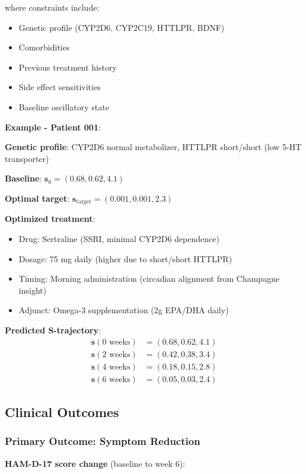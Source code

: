 where constraints include:
\begin{itemize}
\item Genetic profile (CYP2D6, CYP2C19, HTTLPR, BDNF)
\item Comorbidities
\item Previous treatment history
\item Side effect sensitivities
\item Baseline oscillatory state
\end{itemize}

\textbf{Example - Patient 001}:

\textbf{Genetic profile}: CYP2D6 normal metabolizer, HTTLPR short/short (low 5-HT transporter)

\textbf{Baseline}: $\mathbf{s}_0 = (0.68, 0.62, 4.1)$

\textbf{Optimal target}: $\mathbf{s}_{\text{target}} = (0.001, 0.001, 2.3)$

\textbf{Optimized treatment}:
\begin{itemize}
\item Drug: Sertraline (SSRI, minimal CYP2D6 dependence)
\item Dosage: 75 mg daily (higher due to short/short HTTLPR)
\item Timing: Morning administration (circadian alignment from Champagne insight)
\item Adjunct: Omega-3 supplementation (2g EPA/DHA daily)
\end{itemize}

\textbf{Predicted S-trajectory}:
\begin{align}
\mathbf{s}(0\text{ weeks}) &= (0.68, 0.62, 4.1) \\
\mathbf{s}(2\text{ weeks}) &= (0.42, 0.38, 3.4) \\
\mathbf{s}(4\text{ weeks}) &= (0.18, 0.15, 2.8) \\
\mathbf{s}(6\text{ weeks}) &= (0.05, 0.03, 2.4)
\end{align}

\subsection{Clinical Outcomes}

\subsubsection{Primary Outcome: Symptom Reduction}

\textbf{HAM-D-17 score change} (baseline to week 6):

